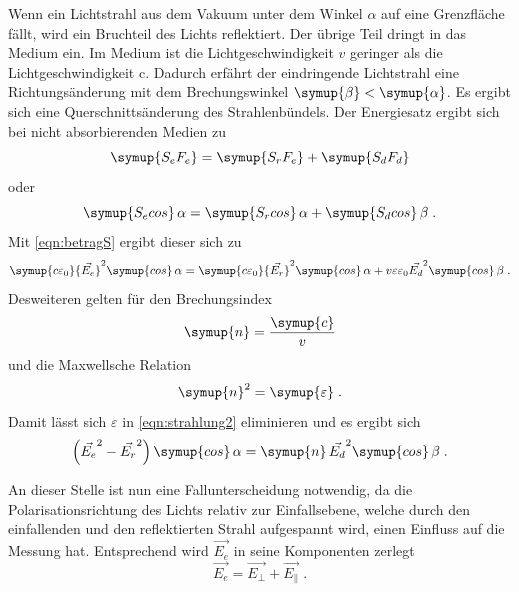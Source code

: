 Wenn ein Lichtstrahl aus dem Vakuum unter dem Winkel $\alpha$ auf eine Grenzfläche fällt, wird ein Bruchteil des Lichts reflektiert. Der übrige 
Teil dringt in das Medium ein. Im Medium ist die Lichtgeschwindigkeit $v$ geringer als die Lichtgeschwindigkeit c. Dadurch erfährt der eindringende 
Lichtstrahl eine Richtungsänderung mit dem Brechungswinkel $\symup{\beta} < \symup{\alpha}$. Es ergibt sich eine Querschnittsänderung des 
Strahlenbündels. Der Energiesatz ergibt sich bei nicht absorbierenden Medien zu 
\begin{equation*}
    \symup{S_eF_e} = \symup{S_rF_e} + \symup{S_dF_d}
\end{equation*}
oder
\begin{equation*}
    \symup{S_ecos} \,\alpha = \symup{S_rcos} \,\alpha + \symup{S_dcos} \,\beta \; . 
\end{equation*}
Mit \autoref{eqn:betragS} ergibt dieser sich zu 
\begin{equation}
    \symup{c\varepsilon_0}{\vec{E_e}}^2\symup{cos} \,\alpha = \symup{c\varepsilon_0}{\vec{E_r}}^2\symup{cos} \,\alpha + v{\varepsilon \varepsilon_0}{\vec{E_d}}^2\symup{cos} \,\beta \; .
    \label{eqn:strahlung2}
\end{equation}
Desweiteren gelten für den Brechungsindex
\begin{equation*}
    \symup{n} = \frac{\symup{c}}{v}
\end{equation*}
und die Maxwellsche Relation
\begin{equation*}
    \symup{n}^2 = \symup{\varepsilon} \; .
\end{equation*}
Damit lässt sich $\varepsilon$ in \autoref{eqn:strahlung2} eliminieren und es ergibt sich
\begin{equation}
    \left({\vec{E_e}}^2-{\vec{E_r}}^2\right)\symup{cos} \,\alpha = \symup{n}\,{\vec{E_d}}^2\symup{cos} \,\beta \; .
    \label{eqn:strahlung3}
\end{equation}

An dieser Stelle ist nun eine Fallunterscheidung notwendig, da die Polarisationsrichtung des Lichts relativ zur Einfallsebene, welche durch 
den einfallenden und den reflektierten Strahl aufgespannt wird, einen Einfluss auf die Messung hat. Entsprechend 
wird $\vec{E_e}$ in seine Komponenten zerlegt
\begin{equation*}
    \vec{E_e} = \vec{E_{\perp}} + \vec{E_{\|}} \; .
\end{equation*}


